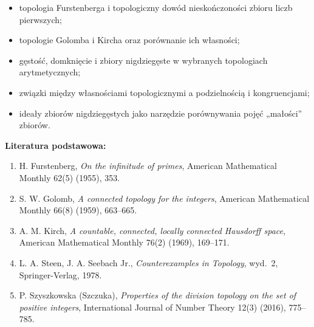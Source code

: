 \documentclass[12pt,a4paper]{article}
\begin{document}
\begin{itemize}[leftmargin=*]
    \item topologia Furstenberga i topologiczny dowód nieskończoności
    zbioru liczb pierwszych;
    
    \item topologie Golomba i Kircha oraz porównanie ich własności;
    
    \item gęstość, domknięcie i zbiory nigdziegęste w wybranych
    topologiach arytmetycznych;
    
    \item związki między własnościami topologicznymi a podzielnością
    i kongruencjami;
    
    \item ideały zbiorów nigdziegęstych jako narzędzie porównywania
    pojęć „małości” zbiorów.
\end{itemize}

\bigskip

\noindent
\textbf{Literatura podstawowa:}

\begin{enumerate}[leftmargin=*]
    \item H. Furstenberg, \emph{On the infinitude of primes},
    American Mathematical Monthly 62(5) (1955), 353.

    \item S. W. Golomb, \emph{A connected topology for the integers},
    American Mathematical Monthly 66(8) (1959), 663--665.

    \item A. M. Kirch, \emph{A countable, connected, locally connected
    Hausdorff space}, American Mathematical Monthly 76(2) (1969),
    169--171.

    \item L. A. Steen, J. A. Seebach Jr.,
    \emph{Counterexamples in Topology}, wyd.~2,
    Springer-Verlag, 1978.

    \item P. Szyszkowska (Szczuka),
    \emph{Properties of the division topology on the set of positive
    integers}, International Journal of Number Theory 12(3) (2016),
    775--785.
\end{enumerate}
\end{document}
